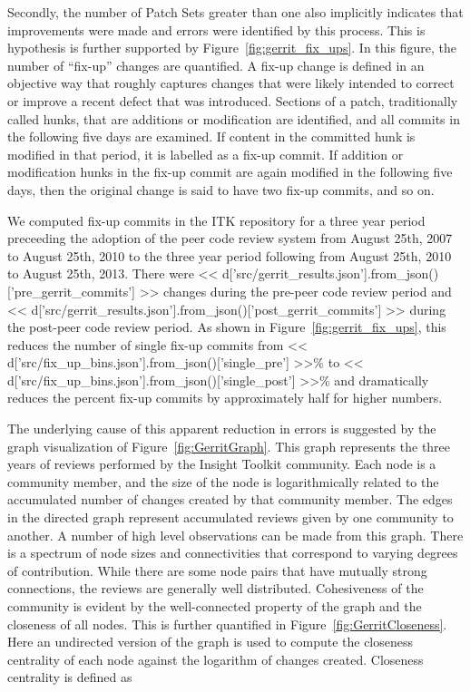 \documentclass{frontiersENG} %
\begin{document}
Secondly, the number of Patch Sets greater than one also implicitly indicates that
improvements were made and errors were identified by this process.  This is
hypothesis is further supported by Figure~\ref{fig:gerrit_fix_ups}.  In this
figure, the number of ``fix-up'' changes are quantified. A fix-up change is
defined in an objective way that roughly captures changes that were likely
intended to correct or improve a recent defect that was introduced.  Sections
of a patch, traditionally called hunks, that are additions or modification are
identified, and all commits in the following five days are examined.  If
content in the committed hunk is modified in that period, it is labelled as
a fix-up commit.  If addition or modification hunks in the fix-up commit are again
modified in the following five days, then the original change is said to have
two fix-up commits, and so on.

We computed fix-up commits in the ITK repository for a three year period
preceeding the adoption of the peer code review system from August 25th, 2007
to August 25th, 2010 to the three year period following from August 25th, 2010
to August 25th, 2013.  There were
<< d['src/gerrit_results.json'].from_json()['pre_gerrit_commits'] >>
changes during the pre-peer code review period and
<< d['src/gerrit_results.json'].from_json()['post_gerrit_commits'] >>
during the post-peer code review period.  As shown in
Figure~\ref{fig:gerrit_fix_ups}, this reduces the number of
single fix-up commits from <<
d['src/fix_up_bins.json'].from_json()['single_pre'] >>\%
to << d['src/fix_up_bins.json'].from_json()['single_post'] >>\% and
dramatically reduces the percent fix-up commits by approximately half for
higher numbers.

The underlying cause of this apparent reduction in errors is suggested by the
graph visualization of Figure~\ref{fig:GerritGraph}. This graph represents
the three years of reviews performed by the Insight Toolkit community. Each
node is a community member, and the size of the node is logarithmically
related to the accumulated number of changes created by that community member.
The edges in the directed graph represent accumulated reviews given by one
community to another. A number of high level observations can be made from
this graph.  There is a spectrum of node sizes and connectivities that
correspond to varying degrees of contribution. While there are some node pairs
that have mutually strong connections, the reviews are generally well
distributed.  Cohesiveness of the community is evident by the well-connected
property of the graph and the closeness of all nodes.  This is further
quantified in Figure~\ref{fig:GerritCloseness}.  Here an undirected version
of the graph is used to compute the closeness centrality of each node against
the logarithm of changes created.  Closeness centrality is defined
as \cite{Freeman1979}
\end{document}
